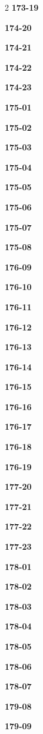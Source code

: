 \documentclass[10pt,a4paper]{article}
\begin{document}
\begin{multicols}{2}
\noindent\textbf{173-19}\ \par
\noindent\textbf{174-20}\ \par
\noindent\textbf{174-21}\ \par
\noindent\textbf{174-22}\ \par
\noindent\textbf{174-23}\ \par
\noindent\textbf{175-01}\ \par
\noindent\textbf{175-02}\ \par
\noindent\textbf{175-03}\ \par
\noindent\textbf{175-04}\ \par
\noindent\textbf{175-05}\ \par
\noindent\textbf{175-06}\ \par
\noindent\textbf{175-07}\ \par
\noindent\textbf{175-08}\ \par
\noindent\textbf{176-09}\ \par
\noindent\textbf{176-10}\ \par
\noindent\textbf{176-11}\ \par
\noindent\textbf{176-12}\ \par
\noindent\textbf{176-13}\ \par
\noindent\textbf{176-14}\ \par
\noindent\textbf{176-15}\ \par
\noindent\textbf{176-16}\ \par
\noindent\textbf{176-17}\ \par
\noindent\textbf{176-18}\ \par
\noindent\textbf{176-19}\ \par
\noindent\textbf{177-20}\ \par
\noindent\textbf{177-21}\ \par
\noindent\textbf{177-22}\ \par
\noindent\textbf{177-23}\ \par
\noindent\textbf{178-01}\ \par
\noindent\textbf{178-02}\ \par
\noindent\textbf{178-03}\ \par
\noindent\textbf{178-04}\ \par
\noindent\textbf{178-05}\ \par
\noindent\textbf{178-06}\ \par
\noindent\textbf{178-07}\ \par
\noindent\textbf{179-08}\ \par
\noindent\textbf{179-09}\ \par

\end{multicols}
\end{document}
